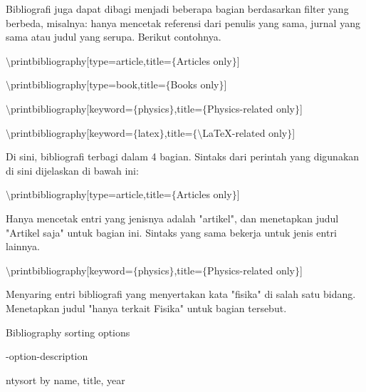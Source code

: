\begin{itemize}
Bibliografi juga dapat dibagi menjadi beberapa bagian berdasarkan filter yang berbeda, misalnya: hanya mencetak referensi dari penulis yang sama, jurnal yang sama atau judul yang serupa. Berikut contohnya.\par

$\setminus$printbibliography[type=article,title=$ \{ $Articles only$ \} $]\par

$\setminus$printbibliography[type=book,title=$ \{ $Books only$ \} $]\par

 \par

$\setminus$printbibliography[keyword=$ \{ $physics$ \} $,title=$ \{ $Physics-related only$ \} $]\par

$\setminus$printbibliography[keyword=$ \{ $latex$ \} $,title=$ \{ $$\setminus$LaTeX-related only$ \} $]\par
\vspace{\baselineskip}
Di sini, bibliografi terbagi dalam 4 bagian. Sintaks dari perintah yang digunakan di sini dijelaskan di bawah ini:\par

$\setminus$printbibliography[type=article,title=$ \{ $Articles only$ \} $]\par
\vspace{\baselineskip}
Hanya mencetak entri yang jenisnya adalah "artikel", dan menetapkan judul "Artikel saja" untuk bagian ini. Sintaks yang sama bekerja untuk jenis entri lainnya.\par

$\setminus$printbibliography[keyword=$ \{ $physics$ \} $,title=$ \{ $Physics-related only$ \} $]\par

Menyaring entri bibliografi yang menyertakan kata "fisika" di salah satu bidang. Menetapkan judul "hanya terkait Fisika" untuk bagian tersebut.\par

Bibliography sorting options\par

-option\hspace*{0.5in}\hspace*{0.5in}\hspace*{0.5in}-description\par

nty\hspace*{0.5in}\hspace*{0.5in}\hspace*{0.5in}sort by name, title, year\par


\end{itemize}
